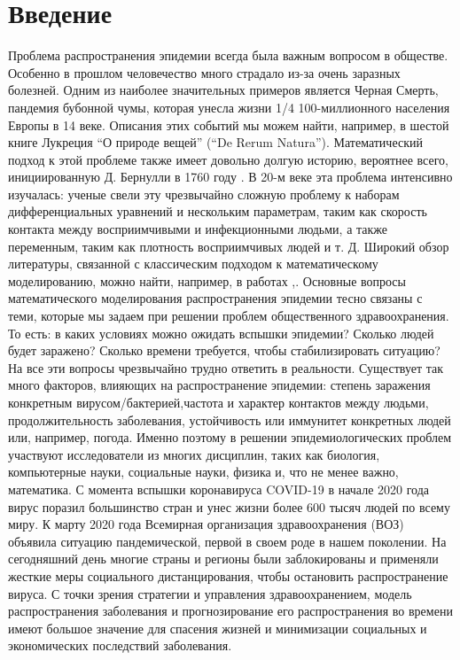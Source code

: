 \chapter*{Введение}

Проблема распространения эпидемии всегда была важным вопросом в обществе. Особенно в прошлом человечество много страдало из-за очень заразных болезней. Одним из наиболее значительных примеров является Черная Смерть, пандемия бубонной чумы, которая унесла жизни 1/4 100-миллионного населения Европы в 14 веке. Описания этих событий мы можем найти, например, в шестой книге Лукреция  “О природе вещей” (“De Rerum Natura”). Математический подход к этой проблеме также имеет довольно долгую историю, вероятнее всего, инициированную Д. Бернулли в 1760 году \cite{Anderson-May}. В 20-м веке эта проблема интенсивно изучалась: ученые свели эту чрезвычайно сложную проблему к наборам дифференциальных уравнений и нескольким параметрам, таким как скорость контакта между восприимчивыми и инфекционными людьми, а также переменным, таким как плотность восприимчивых людей и т. Д. Широкий обзор литературы, связанной с классическим подходом к математическому моделированию, можно найти, например, в работах \cite{Anderson-May},\cite{Bailey}.\newline
Основные вопросы математического моделирования распространения эпидемии тесно связаны с теми, которые мы задаем при решении проблем общественного здравоохранения. То есть: в каких условиях можно ожидать вспышки эпидемии? Сколько людей будет заражено? Сколько времени требуется, чтобы стабилизировать ситуацию? На все эти вопросы чрезвычайно трудно ответить в реальности. Существует так много факторов, влияющих на распространение эпидемии: степень заражения конкретным вирусом/бактерией,частота и характер контактов между людьми, продолжительность заболевания, устойчивость или иммунитет конкретных людей или, например, погода. Именно поэтому в решении эпидемиологических проблем участвуют исследователи из многих дисциплин, таких как биология, компьютерные науки, социальные науки, физика и, что не менее важно, математика. \newline
С момента вспышки коронавируса COVID-19 в начале 2020 года вирус поразил большинство стран и унес жизни более 600 тысяч людей по всему миру. К марту 2020 года Всемирная организация здравоохранения (ВОЗ) объявила ситуацию пандемической, первой в своем роде в нашем поколении. На сегодняшний день многие страны и регионы были заблокированы и применяли жесткие меры социального дистанцирования, чтобы остановить распространение вируса. С точки зрения стратегии и управления здравоохранением, модель распространения заболевания и прогнозирование его распространения во времени имеют большое значение для спасения жизней и минимизации социальных и экономических последствий заболевания.


